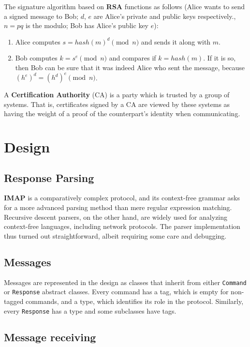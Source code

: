 \documentclass[a4]{report}
\begin{document}
The signature algorithm based on \textbf{RSA} functions as follows (Alice wants to send a signed message to Bob; $d$, $e$ are Alice's private and public keys respectively., $n=pq$ is the modulo; Bob has Alice's public key $e$):

\begin{enumerate}
  \item Alice computes $s=hash(m)^{d}\pmod{n}$ and sends it along with $m$.
  \item Bob computes $k=s^{e} \pmod{n}$ and compares if $k = hash(m)$. If it is so, then Bob can be sure that it was indeed Alice who sent the message, because $(h^{e})^{d}=(h^{d})^{e} \pmod{n}$.
\end{enumerate}

A \textbf{Certification Authority} (CA) is a party which is trusted by a group of systems. That is, certificates signed by a CA are viewed by these systems as having the weight of a proof of the counterpart's identity when communicating.

\chapter{Design}


\section{Response Parsing}

\textbf{IMAP} is a comparatively complex protocol, and its context-free grammar asks for a more advanced parsing method than mere regular expression matching. Recursive descent parsers, on the other hand, are widely used for analyzing context-free languages, including network protocols. The parser implementation thus turned out straightforward, albeit requiring some care and debugging.

\section{Messages}

Messages are represented in the design as classes that inherit from either \texttt{Command} or \texttt{Response} abstract classes. Every command has a tag, which is empty for non-tagged commands, and a type, which identifies its role in the protocol. Similarly, every \texttt{Response} has a type and some subclasses have tags.

\section{Message receiving}
\end{document}
